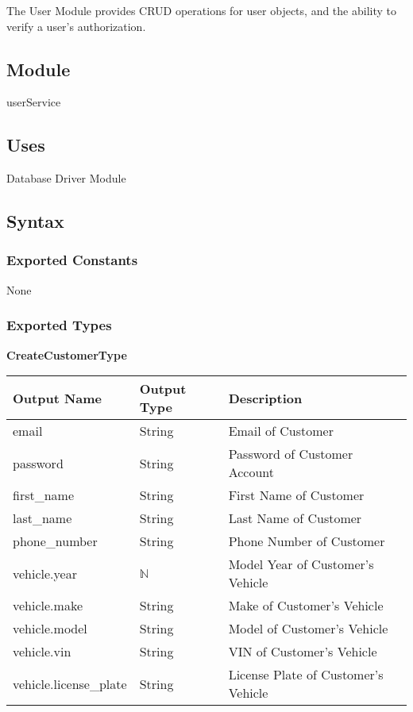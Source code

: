 \documentclass[12pt, titlepage]{article}
\begin{document}
The User Module provides CRUD operations for user objects, and the ability to verify a user's
authorization.

\subsection{Module}

userService

\subsection{Uses}

Database Driver Module

\subsection{Syntax}

\subsubsection{Exported Constants}

None

\subsubsection{Exported Types}

\textbf{CreateCustomerType}

\begin{table}[H]
	\begin{tabular}{|p{}|p{}|p{}|}
		\hline
		\textbf{Output Name}   & \textbf{Output Type} & \textbf{Description}                \\
		\hline
		email                  & String               & Email of Customer                   \\
		\hline
		password               & String               & Password of Customer Account        \\
		\hline
		first\_name            & String               & First Name of Customer              \\
		\hline
		last\_name             & String               & Last Name of Customer               \\
		\hline
		phone\_number          & String               & Phone Number of Customer            \\
		\hline
		vehicle.year           & $\mathbb{N}$         & Model Year of Customer's Vehicle    \\
		\hline
		vehicle.make           & String               & Make of Customer's Vehicle          \\
		\hline
		vehicle.model          & String               & Model of Customer's Vehicle         \\
		\hline
		vehicle.vin            & String               & VIN of Customer's Vehicle           \\
		\hline
		vehicle.license\_plate & String               & License Plate of Customer's Vehicle \\
		\hline
	\end{tabular}
\end{table}
\end{document}
